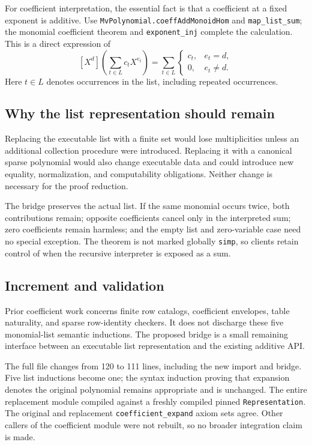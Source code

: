 \documentclass[11pt,letterpaper]{article}
\newcommand{\code}[1]{\nolinkurl{#1}}
\begin{document}
For coefficient interpretation, the essential fact is that a coefficient at a fixed exponent is additive. Use \code{MvPolynomial.coeffAddMonoidHom} and \code{map_list_sum}; the monomial coefficient theorem and \code{exponent_inj} complete the calculation. This is a direct expression of
\[
 [X^d]\!\left(\sum_{t\in L} c_tX^{e_t}\right)
   =\sum_{t\in L}\begin{cases}c_t,&e_t=d,\\0,&e_t\ne d.\end{cases}
\]
Here $t\in L$ denotes occurrences in the list, including repeated occurrences.

\subsection{Why the list representation should remain}

Replacing the executable list with a finite set would lose multiplicities unless an additional collection procedure were introduced. Replacing it with a canonical sparse polynomial would also change executable data and could introduce new equality, normalization, and computability obligations. Neither change is necessary for the proof reduction.

The bridge preserves the actual list. If the same monomial occurs twice, both contributions remain; opposite coefficients cancel only in the interpreted sum; zero coefficients remain harmless; and the empty list and zero-variable case need no special exception. The theorem is not marked globally \code{simp}, so clients retain control of when the recursive interpreter is exposed as a sum.

\subsection{Increment and validation}

Prior coefficient work concerns finite row catalogs, coefficient envelopes, table naturality, and sparse row-identity checkers. It does not discharge these five monomial-list semantic inductions. The proposed bridge is a small remaining interface between an executable list representation and the existing additive API.

The full file changes from 120 to 111 lines, including the new import and bridge. Five list inductions become one; the syntax induction proving that expansion denotes the original polynomial remains appropriate and is unchanged. The entire replacement module compiled against a freshly compiled pinned \code{Representation}. The original and replacement \code{coefficient_expand} axiom sets agree. Other callers of the coefficient module were not rebuilt, so no broader integration claim is made.
\end{document}
